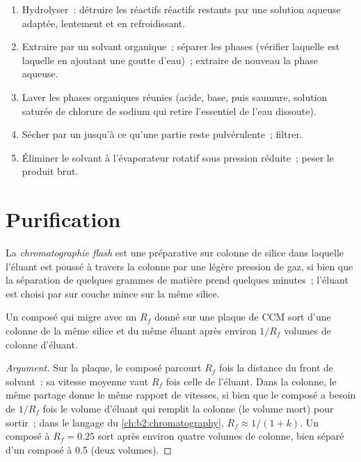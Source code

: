 \begin{method}\label{met:b2:lab-techniques-2:work-up}
\begin{enumerate}
  \item Hydrolyser~: détruire les réactifs réactifs restants par une solution aqueuse adaptée, lentement
        et en refroidissant.
  \item Extraire par un solvant organique~; séparer les phases (vérifier laquelle est laquelle en ajoutant
        une goutte d'eau)~; extraire de nouveau la phase aqueuse.
  \item Laver les phases organiques réunies (acide, base, puis saumure, solution saturée de chlorure de
        sodium qui retire l'essentiel de l'eau dissoute).
  \item Sécher par un  jusqu'à ce qu'une partie reste pulvérulente~; filtrer.
  \item Éliminer le solvant à l'évaporateur rotatif sous pression réduite~; peser le produit brut.
\end{enumerate}
\end{method}

\section{Purification}

\begin{definition}\label{def:b2:lab-techniques-2:flash}
La \emph{chromatographie flash} est une  préparative sur
colonne de silice dans laquelle l'éluant est poussé à travers la colonne par une légère pression de gaz,
si bien que la séparation de quelques grammes de matière prend quelques minutes~; l'éluant est choisi par
 sur couche mince sur la même silice.
\end{definition}

\begin{proposition}\label{prop:b2:lab-techniques-2:column-volumes}
Un composé qui migre avec un $R_f$ donné sur une plaque de CCM sort d'une colonne de la même silice et
du même éluant après environ $1/R_f$ volumes de colonne d'éluant.
\end{proposition}

\begin{proof}[Argument]
Sur la plaque, le composé parcourt $R_f$ fois la distance du front de solvant~: sa vitesse moyenne vaut
$R_f$ fois celle de l'éluant. Dans la colonne, le même partage donne le même rapport de vitesses, si
bien que le composé a besoin de $1/R_f$ fois le volume d'éluant qui remplit la colonne (le volume mort)
pour sortir~; dans le langage du \cref{ch:b2:chromatography}, $R_f \approx 1/(1 + k)$. Un composé à $R_f = 0.25$
sort après environ quatre volumes de colonne, bien séparé d'un composé à 0.5 (deux volumes).
\end{proof}

